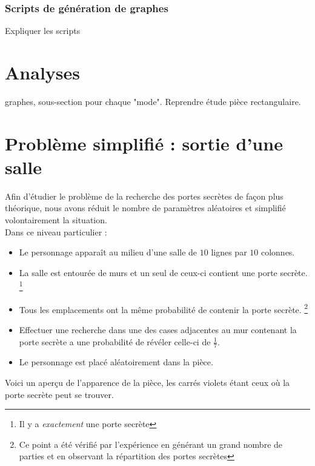 \documentclass[a4paper,12pt]{article}
\begin{document}
\subsubsection*{Scripts de génération de graphes}

Expliquer les scripts


\section{Analyses}

graphes, sous-section pour chaque "mode". Reprendre étude pièce rectangulaire.
\section{Problème simplifié : sortie d'une salle}

Afin d'étudier le problème de la recherche des portes secrètes de façon plus
théorique, nous avons réduit le nombre de paramètres aléatoires et simplifié
volontairement la situation.
\\
Dans ce niveau particulier :
\begin{itemize}
\item Le personnage apparaît au milieu d'une salle de $10$ lignes par $10$
  colonnes.
\item La salle est entourée de murs et un seul de ceux-ci contient une porte
  secrète.
  \footnote{Il y a {\em exactement} une porte secrète}
\item Tous les emplacements ont la même probabilité de contenir la porte
  secrète.
  \footnote{Ce point a été vérifié par l'expérience en générant un grand nombre
    de parties et en observant la répartition des portes secrètes}
\item Effectuer une recherche dans une des cases adjacentes au mur contenant la
  porte secrète a une probabilité de révéler celle-ci de $\frac{1}{7}$.
\item Le personnage est placé aléatoirement dans la pièce.
\end{itemize}

Voici un aperçu de l'apparence de la pièce, les carrés violets étant ceux où la
porte secrète peut se trouver.

\begin{center}
\end{center}
\end{document}
